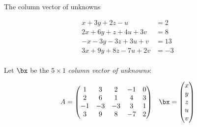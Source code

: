 \documentclass{beamer}
\begin{document}

\begin{frame}{The column vector of unknowns}

\begin{align*}
 x + 3y + 2z - u  \qquad &= 2 \\
2x + 6y + z + 4u + 3v  &= 8 \\
-x -3y  -3z + 3u + v  &= 13 \\
3x + 9y + 8z  -7u + 2v  &= -3 \\
\end{align*}

Let $\bx$ be the $5 \times 1$  \emph{column vector of unknowns}:

$$
\begin{matrix}
A =
\begin{pmatrix}
1 & 3 & 2 & -1 & 0 \\
2 & 6 & 1 & 4 & 3\\
-1 & -3 & -3 & 3 & 1 \\
3 & 9 & 8 & -7 & 2
\end{pmatrix}
&
\bx =
\begin{pmatrix}
x \\ y \\ z \\ u \\ v
\end{pmatrix}
\end{matrix}
$$

\end{frame}

\end{document}

